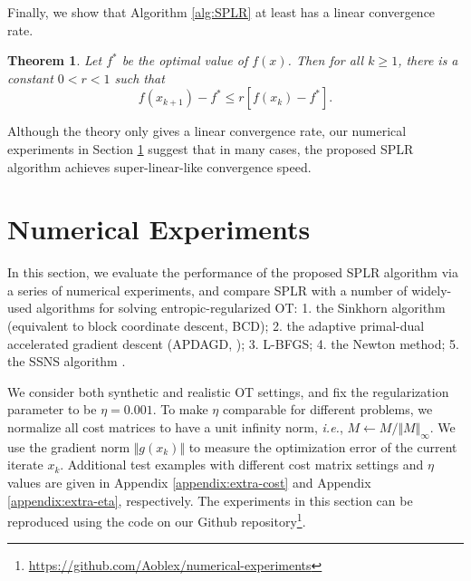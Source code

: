 \documentclass{article}
\theoremstyle{plain}
\newtheorem{theorem}{Theorem}[section]
\theoremstyle{definition}
\theoremstyle{remark}
\begin{document}
Finally, we show that Algorithm \ref{alg:SPLR} at least has a linear convergence rate.

\begin{theorem}
\label{thm:linear_convergence}
Let $f^*$ be the optimal value of $f(x)$. Then for all $k\ge 1$, there is a constant $0<r<1$ such that
\[
f(x_{k+1})-f^*\le r[f(x_k)-f^*].
\]
\end{theorem}

Although the theory only gives a linear convergence rate, our numerical experiments in Section \ref{sec:experiments} suggest that in many cases, the proposed SPLR algorithm achieves super-linear-like convergence speed.


\section{Numerical Experiments}
\label{sec:experiments}
In this section, we evaluate the performance of the proposed SPLR algorithm via a series of numerical experiments, and compare SPLR with a number of widely-used algorithms for solving entropic-regularized OT: 1. the Sinkhorn algorithm (equivalent to block coordinate descent, BCD); 2. the adaptive primal-dual accelerated gradient descent (APDAGD, \citealp{dvurechensky2018computational}); 3. L-BFGS; 4. the Newton method; 5. the SSNS algorithm \citep{tang2024safe}.

We consider both synthetic and realistic OT settings, and fix the regularization parameter to be $\eta=0.001$. To make $\eta$ comparable for different problems, we normalize all cost matrices to have a unit infinity norm, \emph{i.e.}, $M\gets M/\Vert M \Vert_\infty$. We use the gradient norm $\Vert g(x_k) \Vert$ to measure the optimization error of the current iterate $x_k$.
Additional test examples with different cost matrix settings and $\eta$ values are given in Appendix \ref{appendix:extra-cost} and Appendix \ref{appendix:extra-eta}, respectively.
The experiments in this section can be reproduced using the code on our Github repository\footnote{\url{https://github.com/Aoblex/numerical-experiments}}.

\end{document}
